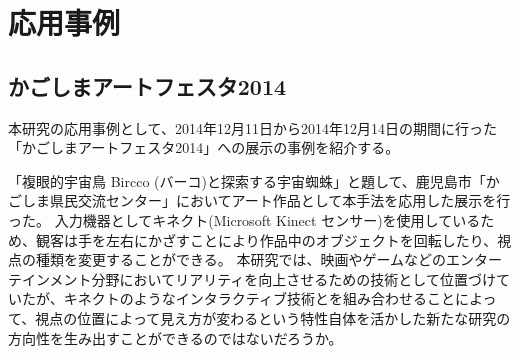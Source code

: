 \chapter{応用事例}

\section{かごしまアートフェスタ2014}
\label{SKagoshima}

本研究の応用事例として、2014年12月11日から2014年12月14日の期間に行った「かごしまアートフェスタ2014」への展示の事例を紹介する。

「複眼的宇宙鳥 Bircco (バーコ)と探索する宇宙蜘蛛」と題して、鹿児島市「かごしま県民交流センター」においてアート作品として本手法を応用した展示を行った。
入力機器としてキネクト(Microsoft Kinect センサー)を使用しているため、観客は手を左右にかざすことにより作品中のオブジェクトを回転したり、視点の種類を変更することができる。
本研究では、映画やゲームなどのエンターテインメント分野においてリアリティを向上させるための技術として位置づけていたが、キネクトのようなインタラクティブ技術とを組み合わせることによって、視点の位置によって見え方が変わるという特性自体を活かした新たな研究の方向性を生み出すことができるのではないだろうか。




